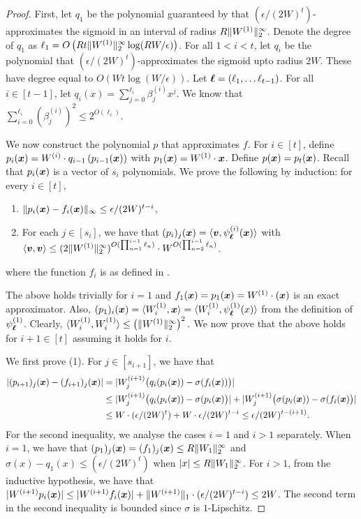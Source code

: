 \begin{proof}
    First, let $q_{1}$ be the polynomial guaranteed by  that $(\epsilon/(2W)^t)$-approximates the sigmoid in an interval of radius $R\|W^{(1)}\|_{2}^{\infty}$. Denote the degree of $q_1$ as $\ell_1=O\left(Rt\|W^{(1)}\|_{2}^{\infty}\log(RW/\epsilon)\right)$. For all $1<i<t$, let $q_i$ be the polynomial that $(\epsilon/(2W)^{t})$-approximates the sigmoid upto radius $2W$. These have degree equal to $O\left(Wt\log(W/\epsilon)\right)$. Let $\boldsymbol{\ell}=(\ell_1,\ldots \ell_{t-1})$. For all $i\in [t-1]$, let $q_{i}(x)=\sum_{j=0}^{\ell_i}\beta^{(i)}_jx^{j}$. We know that $\sum_{i=0}^{\ell_i}(\beta^{(i)}_j)^2\leq 2^{O(\ell_i)}$.
    
    We now construct the polynomial $p$ that approximates $f$. For $i\in [t]$, define $p_{i}({\bm{x}})=W^{(i)}\cdot q_{i-1}\left(p_{i-1}({\bm{x}})\right)$ with $p_1({\bm{x}})=W^{(1)}\cdot {\bm{x}}$. Define $p({\bm{x}})=p_{t}({\bm{x}})$. Recall that $p_{i}({\bm{x}})$ is a vector of $s_{i}$ polynomials. We prove the following by induction: for every $i\in[t]$,
    \begin{enumerate}
        \item $\|p_{i}({\bm{x}})-f_{i}({\bm{x}})\|_{\infty}\leq \epsilon/(2W)^{t-i}$,
        \item For each $j\in [s_i]$, we have that $(p_{i})_{j}({\bm{x}})=\langle{\bm{v}},\psi_{\boldsymbol{\ell}}^{(i)}({\bm{x}})\rangle$ with $\langle{\bm{v}},{\bm{v}}\rangle\leq (2\|W^{(1)}\|_{2}^{\infty})^{O(\prod_{n=1}^{i-1}\ell_{n})}\cdot W^{O(\prod_{n=2}^{i-1}\ell_n)}$.
    \end{enumerate}
    where the function $f_i$ is as defined in . 

    The above holds trivially for $i=1$ and $f_1({\bm{x}})=p_1({\bm{x}})=W^{(1)}\cdot ({\bm{x}})$ is an exact approximator. Also, $(p_1)_i({\bm{x}})=\langle W^{(1)}_i,{\bm{x}}\rangle=\langle W^{(1)}_i,\psi_{\boldsymbol{\ell}}^{(1)}(x)\rangle$ from the definition of $\psi_{\boldsymbol{\ell}}^{(1)}$. Clearly, $\langle W^{(1)}_i,W^{(1)}_i\rangle\leq \left(\|W^{(1)}\|_{2}^{\infty}\right)^2.$ We now prove that the above holds for $i+1\in [t]$ assuming it holds for $i$. 

    We first prove (1). For $j\in [s_{i+1}]$, we have that
    \begin{align*}
       |(p_{i+1})_{j}({\bm{x}})-(f_{i+1})_{j}({\bm{x}})|&=|W^{(i+1)}_{j}\bigl(q_{i}(p_{i}({\bm{x}}))-\sigma(f_{i}({\bm{x}}))\bigr)|\\
       &\leq |W^{(i+1)}_{j}\bigl( q_{i}(p_{i}({\bm{x}}))-\sigma(p_{i}({\bm{x}})\bigr)|+|W^{(i+1)}_{j}\bigl( \sigma(p_{i}({\bm{x}}))-\sigma(f_{i}({\bm{x}})\bigr)|\\
       &\leq W\cdot (\epsilon/(2W)^{t})+W\cdot\epsilon/(2W)^{t-i}\leq \epsilon/(2W)^{t-(i+1)}. 
    \end{align*}
    For the second inequality, we analyse the cases $i=1$ and $i>1$ separately. When $i=1$, we have that $(p_1)_{j}({\bm{x}})= (f_{1})_{j}({\bm{x}})\leq R\|W_1\|_{2}^{\infty}$ and $\sigma(x)-q_1(x)\leq (\epsilon/(2W)^t)$ when $|x|\leq R\|W_1\|_{2}^{\infty}$. For $i>1$, from the inductive hypothesis, we have that $|W^{(i+1)}p_i({\bm{x}})|\leq |W^{(i+1)}f_{i}({\bm{x}})|+\|W^{(i+1)}\|_{1}\cdot (\epsilon/(2W)^{t-i})\leq 2W$. The second term in the second inequality is bounded since $\sigma$ is $1$-Lipschitz. 


\end{proof}
